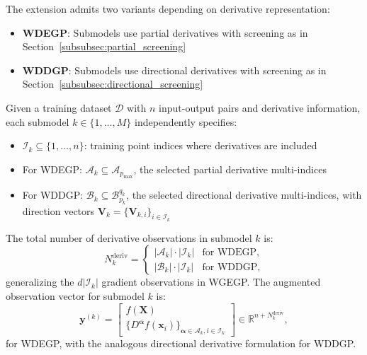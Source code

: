 \documentclass[12pt]{article}
\begin{document}
The extension admits two variants depending on derivative representation:
\begin{itemize}
	\item \textbf{WDEGP}: Submodels use partial derivatives with screening as in Section~\ref{subsubsec:partial_screening}
	\item \textbf{WDDGP}: Submodels use directional derivatives with screening as in Section~\ref{subsubsec:directional_screening}
\end{itemize}

Given a training dataset $\mathcal{D}$ with $n$ input-output pairs and derivative information, each submodel $k \in \{1, \ldots, M\}$ independently specifies:
\begin{itemize}
	\item $\mathcal{I}_k \subseteq \{1, \ldots, n\}$: training point indices where derivatives are included
	\item For WDEGP: $\mathcal{A}_k \subseteq \mathcal{A}_{p_{\max}}$, the selected partial derivative multi-indices
	\item For WDDGP: $\mathcal{B}_k \subseteq \mathcal{B}_{p_k}^{q_k}$, the selected directional derivative multi-indices, with direction vectors $\mathbf{V}_k = \{\mathbf{V}_{k,i}\}_{i \in \mathcal{I}_k}$
\end{itemize}

The total number of derivative observations in submodel $k$ is:
\begin{equation}
	N_k^{\text{deriv}} = \begin{cases}
		|\mathcal{A}_k| \cdot |\mathcal{I}_k| & \text{for WDEGP}, \\
		|\mathcal{B}_k| \cdot |\mathcal{I}_k| & \text{for WDDGP},
	\end{cases}
\end{equation}
generalizing the $d|\mathcal{I}_k|$ gradient observations in WGEGP. The augmented observation vector for submodel $k$ is:
\begin{equation}
	\label{eqn:wdegp_aug_vector}
	\mathbf{y}^{(k)} = \begin{bmatrix} 
		f(\mathbf{X}) \\
		\{D^{\boldsymbol{\alpha}} f(\mathbf{x}_i)\}_{\boldsymbol{\alpha} \in \mathcal{A}_k, i \in \mathcal{I}_k}
	\end{bmatrix} \in \mathbb{R}^{n + N_k^{\text{deriv}}},
\end{equation}
for WDEGP, with the analogous directional derivative formulation for WDDGP.
\end{document}
